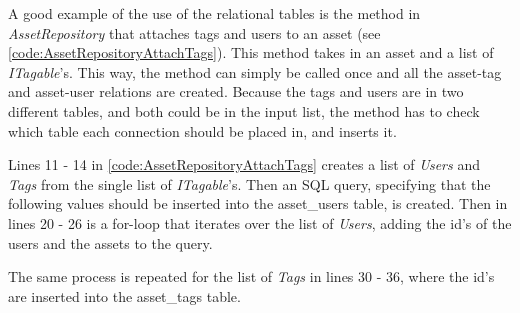 \par
A good example of the use of the relational tables is the method in \textit{AssetRepository} that attaches tags and users to an asset (see \autoref{code:AssetRepositoryAttachTags}). This method takes in an asset and a list of \textit{ITagable}'s. This way, the method can simply be called once and all the asset-tag and asset-user relations are created. Because the tags and users are in two different tables, and both could be in the input list, the method has to check which table each connection should be placed in, and inserts it. 
\par
Lines 11 - 14 in \autoref{code:AssetRepositoryAttachTags} creates a list of \textit{Users} and \textit{Tags} from the single list of \textit{ITagable}'s.
Then an SQL query, specifying that the following values should be inserted into the asset\_users table, is created. Then in lines 20 - 26 is a for-loop that iterates over the list of \textit{Users}, adding the id's of the users and the assets to the query. \par
The same process is repeated for the list of \textit{Tags} in lines 30 - 36, where the id's are inserted into the asset\_tags table.

